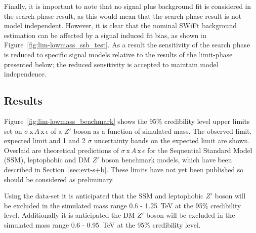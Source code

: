 Finally, it is important to note that no signal plus background fit is considered in the search phase result,
as this would mean that the search phase result is not model independent.
However, it is clear that the nominal SWiFt background estimation can be affected by a signal induced fit bias,
as shown in Figure~\ref{fig:lim-lowmass_ssb_test}.
As a result the sensitivity of the search phase is reduced to specific signal models relative to the results of the limit-phase presented below;
the reduced sensitivity is accepted to maintain model independence.

\subsection{Results}
\label{sec:lim-full_results}

Figure~\ref{fig:lim-lowmass_benchmark} shows the
95\% credibility level upper limits set on $\sigma\,\text{x}\,\mathit{A}\,\text{x}\,\epsilon$
of a $Z'$ boson as a function of simulated mass.
The observed limit, expected limit and 1 and 2 $\sigma$ uncertainty bands on the expected limit are shown.
Overlaid are theoretical predictions of $\sigma\,\text{x}\,\mathit{A}\,\text{x}\,\epsilon$ for the
Sequential Standard Model (SSM), leptophobic and DM $Z'$ boson benchmark models, which have been described in Section~\ref{sec:evt-s+b}.
These limits have not yet been published so should be considered as preliminary.

Using the \lm{} data-set it is anticipated that the SSM and leptophobic $Z'$ boson
will be excluded in the simulated mass range 0.6 - 1.25~TeV at the 95\% credibility level.
Additionally it is anticipated the DM $Z'$ boson will be excluded in the simulated mass range
0.6 - 0.95~TeV  at the 95\% credibility level.

